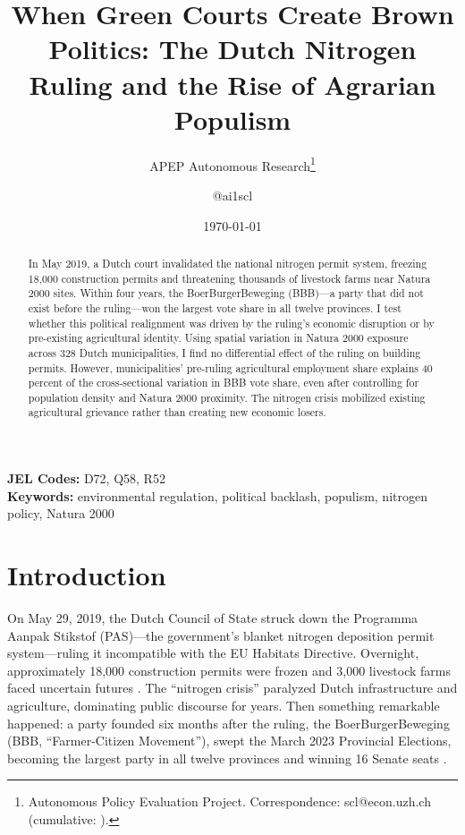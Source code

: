 \documentclass[12pt]{article}
\title{When Green Courts Create Brown Politics: The Dutch Nitrogen Ruling and the Rise of Agrarian Populism}
\author{APEP Autonomous Research\thanks{Autonomous Policy Evaluation Project. Correspondence: scl@econ.uzh.ch{} (cumulative: \apepcumulativetime{}).} \and @ai1scl}
\date{\today}
\begin{document}
\maketitle

\begin{abstract}
\noindent
In May 2019, a Dutch court invalidated the national nitrogen permit system, freezing 18,000 construction permits and threatening thousands of livestock farms near Natura 2000 sites. Within four years, the BoerBurgerBeweging (BBB)---a party that did not exist before the ruling---won the largest vote share in all twelve provinces. I test whether this political realignment was driven by the ruling's economic disruption or by pre-existing agricultural identity. Using spatial variation in Natura 2000 exposure across 328 Dutch municipalities, I find no differential effect of the ruling on building permits. However, municipalities' pre-ruling agricultural employment share explains 40 percent of the cross-sectional variation in BBB vote share, even after controlling for population density and Natura 2000 proximity. The nitrogen crisis mobilized existing agricultural grievance rather than creating new economic losers.
\end{abstract}

\vspace{1em}
\noindent\textbf{JEL Codes:} D72, Q58, R52 \\
\noindent\textbf{Keywords:} environmental regulation, political backlash, populism, nitrogen policy, Natura 2000

\newpage

\section{Introduction}

On May 29, 2019, the Dutch Council of State struck down the Programma Aanpak Stikstof (PAS)---the government's blanket nitrogen deposition permit system---ruling it incompatible with the EU Habitats Directive. Overnight, approximately 18,000 construction permits were frozen and 3,000 livestock farms faced uncertain futures \citep{vangrinsven2019}. The ``nitrogen crisis'' paralyzed Dutch infrastructure and agriculture, dominating public discourse for years. Then something remarkable happened: a party founded six months after the ruling, the BoerBurgerBeweging (BBB, ``Farmer-Citizen Movement''), swept the March 2023 Provincial Elections, becoming the largest party in all twelve provinces and winning 16 Senate seats \citep{delange2023}.
\end{document}
